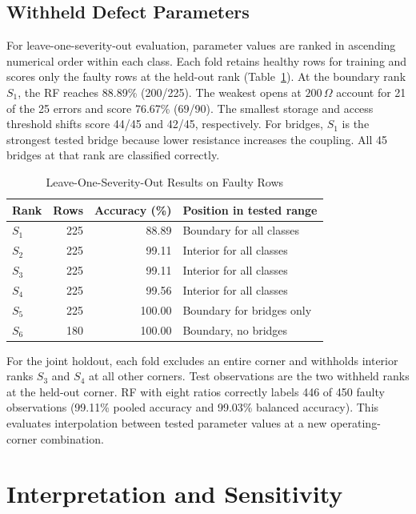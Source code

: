 \documentclass[conference,letterpaper]{IEEEtran}
\begin{document}
\subsection{Withheld Defect Parameters}

For leave-one-severity-out evaluation, parameter values are ranked in ascending numerical order within each class. Each fold retains healthy rows for training and scores only the faulty rows at the held-out rank (Table~\ref{tab:severity}). At the boundary rank $S_1$, the RF reaches 88.89\% (200/225). The weakest opens at $200\,\Omega$ account for 21 of the 25 errors and score 76.67\% (69/90). The smallest storage and access threshold shifts score 44/45 and 42/45, respectively. For bridges, $S_1$ is the strongest tested bridge because lower resistance increases the coupling. All 45 bridges at that rank are classified correctly.

\begin{table}[!t]
\caption{Leave-One-Severity-Out Results on Faulty Rows}
\label{tab:severity}
\centering
\footnotesize
\setlength{\tabcolsep}{4pt}
\begin{tabular}{@{}lrrl@{}}
\toprule
Rank & Rows & Accuracy (\%) & Position in tested range \\
\midrule
$S_1$ & 225 & 88.89 & Boundary for all classes \\
$S_2$ & 225 & 99.11 & Interior for all classes \\
$S_3$ & 225 & 99.11 & Interior for all classes \\
$S_4$ & 225 & 99.56 & Interior for all classes \\
$S_5$ & 225 & 100.00 & Boundary for bridges only \\
$S_6$ & 180 & 100.00 & Boundary, no bridges \\
\bottomrule
\end{tabular}
\end{table}

For the joint holdout, each fold excludes an entire corner and withholds interior ranks $S_3$ and $S_4$ at all other corners. Test observations are the two withheld ranks at the held-out corner. RF with eight ratios correctly labels 446 of 450 faulty observations (99.11\% pooled accuracy and 99.03\% balanced accuracy). This evaluates interpolation between tested parameter values at a new operating-corner combination.

\section{Interpretation and Sensitivity}
\end{document}
